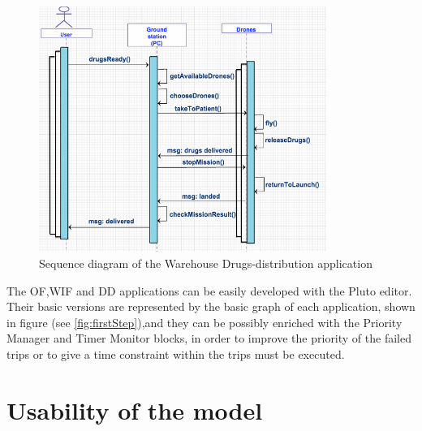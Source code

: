 \begin{figure}[H]
  \centering
  \includegraphics[width=\linewidth,height=8cm]{pictures/DD_sequence.png}
\caption{Sequence diagram of the Warehouse Drugs-distribution application}
  \label{fig:DDSequence}
\end{figure}



The OF,WIF and DD applications can be easily developed with the Pluto editor.
Their basic versions are represented by the basic graph of each application, shown in figure (see \ref{fig:firstStep}),and they can be possibly enriched with the Priority Manager and Timer Monitor blocks, in order to improve the priority of the failed trips or to give a time constraint within the trips must be executed.

\newpage

\section{Usability of the model}
\label{usability}

